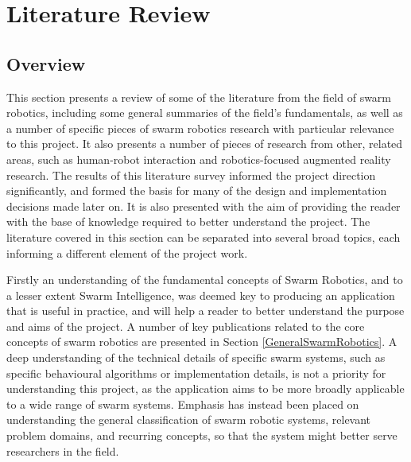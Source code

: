 
\chapter[Literature Review]{Literature Review} %

\label{Chapter2} %


\section{Overview}
This section presents a review of some of the literature from the field of swarm robotics, including some general summaries of the field's fundamentals, as well as a number of specific pieces of swarm robotics research with particular relevance to this project. It also presents a number of pieces of research from other, related areas, such as human-robot interaction and robotics-focused augmented reality research. The results of this literature survey informed the project direction significantly, and formed the basis for many of the design and implementation decisions made later on. It is also presented with the aim of providing the reader with the base of knowledge required to better understand the project. The literature covered in this section can be separated into several broad topics, each informing a different element of the project work.

Firstly an understanding of the fundamental concepts of Swarm Robotics, and to a lesser extent Swarm Intelligence, was deemed key to producing an application that is useful in practice, and will help a reader to better understand the purpose and aims of the project. A number of key publications related to the core concepts of swarm robotics are presented in Section \ref{GeneralSwarmRobotics}. A deep understanding of the technical details of specific swarm systems, such as specific behavioural algorithms or implementation details, is not a priority for understanding this project, as the application aims to be more broadly applicable to a wide range of swarm systems. Emphasis has instead been placed on understanding the general classification of swarm robotic systems, relevant problem domains, and recurring concepts, so that the system might better serve researchers in the field.

